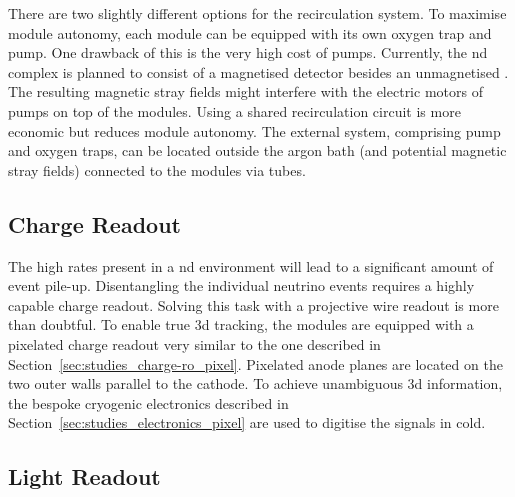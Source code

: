 There are two slightly different options for the recirculation system.
To maximise module autonomy, each module can be equipped with its own oxygen trap and \lar{} pump.
One drawback of this is the very high cost of \lar{} pumps.
Currently, the \dune{} \gls{nd} complex is planned to consist of a magnetised detector besides an unmagnetised \lartpc{}.
The resulting magnetic stray fields might interfere with the electric motors of \lar{} pumps on top of the modules.
Using a shared recirculation circuit is more economic but reduces module autonomy.
The external system, comprising pump and oxygen traps, can be located outside the argon bath (and potential magnetic stray fields) connected to the modules via tubes.


\subsection{Charge Readout}
\label{sec:ac_argoncube_charge-ro}

The high rates present in a \gls{nd} environment will lead to a significant amount of event pile-up.
Disentangling the individual neutrino events requires a highly capable charge readout.
Solving this task with a projective wire readout is more than doubtful.
To enable true \gls{3d} tracking, the modules are equipped with a pixelated charge readout very similar to the one described in Section~\ref{sec:studies_charge-ro_pixel}.
Pixelated anode planes are located on the two outer walls parallel to the cathode.
To achieve unambiguous \gls{3d} information, the bespoke \pixlar{} cryogenic electronics described in Section~\ref{sec:studies_electronics_pixel} are used to digitise the signals in cold.


\subsection{Light Readout}
\label{sec:ac_argoncube_light-ro}

